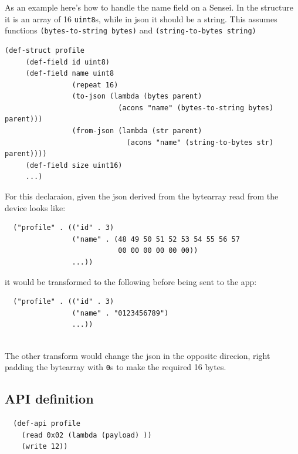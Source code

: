 \documentclass[12pt]{article}
\begin{document}
As an example here's how to handle the name field on a Sensei. In the
structure it is an array of 16 \verb|uint8|s, while in json it should be
a string. This assumes functions \verb|(bytes-to-string bytes)| and
\verb|(string-to-bytes string)|


\begin{verbatim} 
(def-struct profile
     (def-field id uint8)
     (def-field name uint8 
                (repeat 16)
                (to-json (lambda (bytes parent)
                           (acons "name" (bytes-to-string bytes) parent)))
                (from-json (lambda (str parent)
                             (acons "name" (string-to-bytes str) parent))))
     (def-field size uint16)
     ...)
\end{verbatim}

\noindent For this declaraion, given the json derived from the
bytearray read from the device looks like:

\begin{verbatim}
  ("profile" . (("id" . 3)
                ("name" . (48 49 50 51 52 53 54 55 56 57 
                           00 00 00 00 00 00))
                ...))
\end{verbatim}

\noindent it would be transformed to the following before being sent
to the app:

\begin{verbatim}
  ("profile" . (("id" . 3)
                ("name" . "0123456789")
                ...))
 
\end{verbatim}

\noindent The other transform would change the json in the opposite
direcion, right padding the bytearray with \verb|0|s to make the
required 16 bytes.

\subsection{API definition}

\begin{verbatim}
  (def-api profile
    (read 0x02 (lambda (payload) ))
    (write 12))
\end{verbatim}
\end{document}
